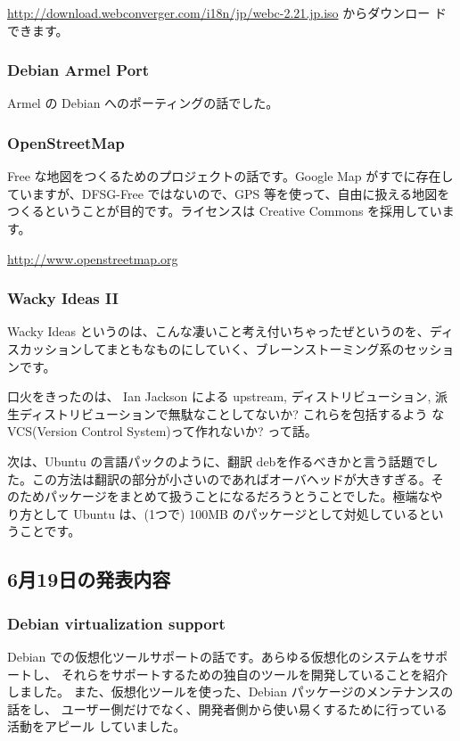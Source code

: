 \documentclass[mingoth,a4paper]{jsarticle}
\begin{document}
 \url{http://download.webconverger.com/i18n/jp/webc-2.21.jp.iso} からダウンロー
 ドできます。

\subsubsection{Debian Armel Port}

Armel の Debian へのポーティングの話でした。

\subsubsection{OpenStreetMap}
  Free な地図をつくるためのプロジェクトの話です。Google Map がすでに存在し
  ていますが、DFSG-Free ではないので、GPS 等を使って、自由に扱える地図を
  つくるということが目的です。ライセンスは Creative Commons を採用しています。

  \url{http://www.openstreetmap.org}

\subsubsection{Wacky Ideas II}
  Wacky Ideas というのは、こんな凄いこと考え付いちゃったぜというのを、ディ
  スカッションしてまともなものにしていく、ブレーンストーミング系のセッショ
  ンです。

  口火をきったのは、 Ian Jackson による upstream, ディストリビューション, 
  派生ディストリビューションで無駄なことしてないか? これらを包括するよう
  なVCS(Version Control System)って作れないか? って話。

  次は、Ubuntu の言語パックのように、翻訳 debを作るべきかと言う話題でし
  た。この方法は翻訳の部分が小さいのであればオーバヘッドが大きすぎる。そ
  のためパッケージをまとめて扱うことになるだろうとうことでした。極端なや
  り方として Ubuntu は、(1つで) 100MB のパッケージとして対処しているとい
  うことです。

\subsection{6月19日の発表内容}
\subsubsection{Debian virtualization support}
  Debian での仮想化ツールサポートの話です。あらゆる仮想化のシステムをサポートし、
  それらをサポートするための独自のツールを開発していることを紹介しました。
  また、仮想化ツールを使った、Debian パッケージのメンテナンスの話をし、
  ユーザー側だけでなく、開発者側から使い易くするために行っている活動をアピール
  していました。
\end{document}
